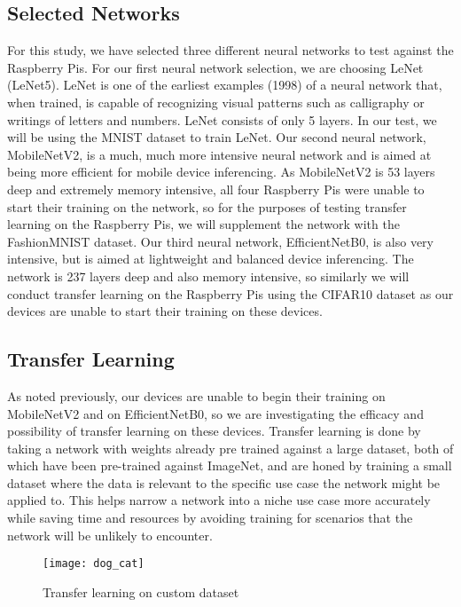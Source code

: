 \documentclass{article}
\begin{document}
\begin{multicols}{2}
\subsection{Selected Networks}
For this study, we have selected three different neural networks to test against the Raspberry Pis. For our first neural network selection, we are choosing LeNet (LeNet5). LeNet is one of the earliest examples (1998) of a neural network that, when trained, is capable of recognizing visual patterns such as calligraphy or writings of letters and numbers. LeNet consists of only 5 layers. In our test, we will be using the MNIST dataset to train LeNet. Our second neural network, MobileNetV2, is a much, much more intensive neural network and is aimed at being more efficient for mobile device inferencing. As MobileNetV2 is 53 layers deep and extremely memory intensive, all four Raspberry Pis were unable to start their training on the network, so for the purposes of testing transfer learning on the Raspberry Pis, we will supplement the network with the FashionMNIST dataset. Our third neural network, EfficientNetB0, is also very intensive, but is aimed at lightweight and balanced device inferencing. The network is 237 layers deep and also memory intensive, so similarly we will conduct transfer learning on the Raspberry Pis using the CIFAR10 dataset as our devices are unable to start their training on these devices.

\subsection{Transfer Learning}
As noted previously, our devices are unable to begin their training on MobileNetV2 and on EfficientNetB0, so we are investigating the efficacy and possibility of transfer learning on these devices. Transfer learning is done by taking a network with weights already pre trained against a large dataset, both of which have been pre-trained against ImageNet, and are honed by training a small dataset where the data is relevant to the specific use case the network might be applied to\cite{website:transfer_learning}. This helps narrow a network into a niche use case more accurately while saving time and resources by avoiding training for scenarios that the network will be unlikely to encounter.

\begin{figure}[H]
\texttt{[image: dog\_cat]}
\centering
\caption{Transfer learning on custom dataset}
\label{fig:dog_cat}
\end{figure}


\end{multicols}
\end{document}

